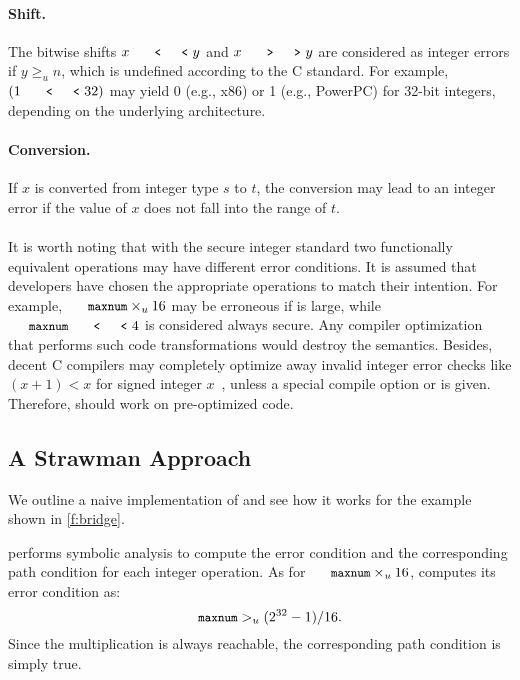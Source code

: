 \paragraph{Shift.}
The bitwise shifts $x \shl y$ and $x \shr y$ are considered as
integer errors if $y \geq_u n$, which is undefined according to the
C standard.  For example, $(1 \shl 32)$ may yield 0 (e.g., x86) or
1 (e.g., PowerPC) for 32-bit integers, depending on the underlying
architecture.

\paragraph{Conversion.}
If $x$ is converted from integer type $s$ to $t$, the conversion
may lead to an integer error if the value of $x$ does not fall into
the range of $t$.

\paragraph{}
It is worth noting that with the secure integer standard two
functionally equivalent operations may have different error conditions.
It is assumed that developers have chosen the appropriate operations
to match their intention.  For example, $\cc{maxnum}\times_u 16$
may be erroneous if  is large, while $\cc{maxnum} \shl
4$ is considered always secure.  Any compiler optimization that
performs such code transformations would destroy the semantics.
Besides, decent C compilers may completely optimize away invalid
integer error checks like $(x + 1) < x$ for signed integer
$x$~\cite{gcc:signed-overflow,us-cert:gcc}, unless a special compile
option  or  is given.  Therefore,
\sys should work on pre-optimized code.

\subsection{A Strawman Approach}

We outline a naive implementation of \sys and see how it works
for the example shown in \autoref{f:bridge}.

\sys performs symbolic analysis to compute the error condition and
the corresponding path condition for each integer operation.  As
for $\cc{maxnum} \times_u 16$, \sys computes its error condition
as:
\begin{equation*}
\cc{maxnum} >_u (2^{32} - 1) / 16.
\end{equation*}
Since the multiplication is always reachable, the corresponding
path condition is simply true.

